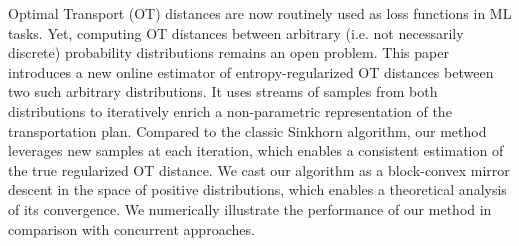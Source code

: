Optimal Transport (OT) distances are now routinely used as loss functions in ML tasks. Yet, computing OT distances between arbitrary (i.e. not necessarily discrete) probability distributions remains an open problem. This paper introduces a new online estimator of entropy-regularized OT distances between two such arbitrary distributions. It uses streams of samples from both distributions to iteratively enrich a non-parametric representation of the transportation plan. Compared to the classic Sinkhorn algorithm, our method leverages new samples at each iteration, which enables a consistent estimation of the true regularized OT distance. We cast our algorithm as a block-convex mirror descent in the space of positive distributions, which enables a theoretical analysis of its convergence. We numerically illustrate the performance of our method in comparison with concurrent approaches.